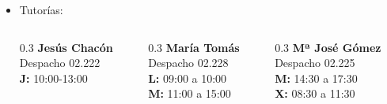 \begin{frame}
\begin{itemize}
    \item \alert{Tutorías:}\vspace{0.2cm}
    \begin{columns}\small
      \begin{column}{0.3\textwidth}
        \textbf{Jesús Chacón}\\
        Despacho 02.222\\
        \textbf{J:} 10:00-13:00\\
        \phantom{~}
      \end{column}
      \begin{column}{0.3\textwidth}
        \textbf{María Tomás}\\
        Despacho 02.228\\
        \textbf{L:} 09:00 a 10:00\\
        \textbf{M:} 11:00 a 15:00
      \end{column}
      \begin{column}{0.3\textwidth}
        \textbf{Mª José Gómez}\\
        Despacho 02.225\\
        \textbf{M:} 14:30  a 17:30\\
        \textbf{X:} 08:30 a 11:30
      \end{column}
    \end{columns}
  \end{itemize}
\end{frame}


